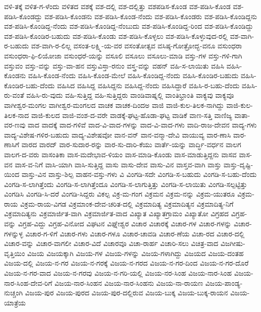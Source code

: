 {ವಳಿ-ತಕ್ಕೆ
ವಳಿತ-ಗ-ಳೆಂದು
ವಳಿತದ
ವಶಕ್ಕೆ
ವಶ-ದಲ್ಲಿ
ವಶ-ದಲ್ಲಿತ್ತು
ವಶಪಡಿಸ-ಕೊಂಡ
ವಶ-ಪಡಿಸಿ-ಕೊಂಡ
ವಶ-ಪಡಿಸಿ-ಕೊಂಡದ್ದು
ವಶ-ಪಡಿಸಿ-ಕೊಂಡನು
ವಶ-ಪಡಿಸಿ-ಕೊಂಡ-ನೆಂದು
ವಶ-ಪಡಿಸಿ-ಕೊಂಡರು
ವಶ-ಪಡಿಸಿ-ಕೊಂಡಿದ್ದನು
ವಶ-ಪಡಿಸಿ-ಕೊಂಡಿದ್ದ-ನೆಂದು
ವಶ-ಪಡಿಸಿ-ಕೊಂಡಿದ್ದ-ನೆಂಬುದು
ವಶ-ಪಡಿಸಿ-ಕೊಂಡಿದ್ದ-ರಿಂದ
ವಶ-ಪಡಿಸಿ-ಕೊಂಡಿದ್ದು
ವಶ-ಪಡಿಸಿ-ಕೊಂಡಿರ-ಬಹುದು
ವಶ-ಪಡಿಸಿ-ಕೊಂಡು
ವಶ-ಪಡಿಸಿ-ಕೊಳ್ಳಲು
ವಶ-ಪಡಿಸಿ-ಕೊಳ್ಳುವುದ-ರಲ್ಲಿ
ವಶ-ವಾಗಿ-ರ-ಬಹುದು
ವಶ-ವಾಗಿ-ರ-ಲಿಲ್ಲ
ವಸಂತ-ಲಕ್ಷ್ಮಿ-ಯ-ವರ
ವಸಂತೋತ್ಸವ
ವಸಿಷ್ಠ-ಗೋತ್ರೋದ್ಭ-ವನೂ
ವಸುಂಧರಾ
ವಸುಂಧರಾ-ಫಿ-ಲಿಯೋಜಾ
ವಸುಂಧರೆ-ಯನ್ನು
ವಸೂಲಿ
ವಸೂಲು
ವಸೂಲು-ಮಾಡಿ
ವಸ್ತು-ಗಳ
ವಸ್ತು-ಗಳಿ-ಗಾಗಿ
ವಸ್ತುವಂ
ವಸ್ತು-ವನ್ನು
ವಸ್ತು-ವಾ-ಹನ
ವಸ್ತುವಿಸ್ತಾ-ರನುಂ
ವಸ್ತ್ರ-ವನ್ನು
ವಹನ್
ವಹಿ-ಸ-ಲಾಯಿತು
ವಹಿಸಿ
ವಹಿಸಿ-ಕೊಂಡನು
ವಹಿಸಿ-ಕೊಂಡ-ನೆಂದು
ವಹಿಸಿ-ಕೊಂಡ-ಮೇಲೆ
ವಹಿಸಿ-ಕೊಂಡಿದ್ದ-ನೆಂದು
ವಹಿಸಿ-ಕೊಂಡಿರ-ಬಹುದು
ವಹಿಸಿ-ಕೊಂಡಿರ-ಬಹು-ದೆಂದು
ವಹಿಸಿದ
ವಹಿಸಿದ್ದ
ವಹಿಸಿದ್ದನು
ವಹಿಸಿದ್ದ-ನೆಂದು
ವಹಿಸಿದ್ದಾರೆ
ವಹಿಸಿ-ರ-ಬಹು-ದೆಂದು
ವಹಿಸಿ-ರು-ವಂತೆ
ವಹಿಸಿ-ರು-ವುದು
ವಹಿ-ಸುತ್ತಿದ್ದ
ವಹಿ-ಸುತ್ತಿದ್ದರು
ವಾಂಡಿವಾಷ್ನಲ್ಲಿ
ವಾಂತಿಭ್ರಾಂತಿ
ವಾಕ್ಯವು
ವಾಕ್ಯವೂ
ವಾಗೀಶ್ವರ-ಮಂಗಲ
ವಾಗೀಶ್ವರ-ಮಂಗಲದ
ವಾಚಕ
ವಾಚಕ-ದಿಂದಅ
ವಾಜಿ
ವಾಜಿ-ಕುಲ-ತಿಲಕ-ನಾಗಿದ್ದು
ವಾಜಿ-ಕುಲ-ತಿಲಕ-ನಾದ
ವಾಜಿ-ಕುಲದ
ವಾಜಿ-ವಂಶ-ದ-ವರೇ
ವಾಡಕ್ಕೆ-ಘಟ್ಟ-ಹೊಡಾ-ಘಟ್ಟ
ವಾಡಿಕೆ
ವಾಣ-ಸತ್ತಿ
ವಾಣಿಜ್ಯ
ವಾತಾ-ವರ-ಣವು
ವಾದ
ವಾದಕ್ಕೆ
ವಾದ-ಗಳಿವೆ
ವಾದ-ವಿ-ವಾದ-ಗಳನ್ನು
ವಾದ-ವಿ-ವಾದ-ಗಳು
ವಾದಿ-ರಾಜ-ದೇವನ
ವಾದ್ಯ-ಗಳು
ವಾದ್ಯ-ವಿಶೇಷ-ಗಳಿರ-ಬಹುದು
ವಾದ್ಯ-ವಿಶೇಷವೋ
ವಾನ-ವನ್
ವಾನ-ವನ್ಮಾ-ದೇವಿ
ವಾಯುವ್ಯ
ವಾರ-ಣಾಸಿ
ವಾರ-ಣಾಸಿಗೆ
ವಾರದ
ವಾರದ್
ವಾರ-ಸುದಾರ-ರನ್ನು
ವಾರ-ಸು-ದಾರಿ-ಕೆಯು
ವಾರ್ತೆ-ಯನ್ನು
ವಾರ್ದ್ಧಿ-ವರ್ಧನ
ವಾಲಗ
ವಾಲಗ-ದ-ವರು
ವಾಸಂತಿಕಾ
ವಾಸ-ಮದೇಭಾವ-ಳಿಯಂ
ವಾಸ-ಮಾಡಿ-ಕೊಂಡು
ವಾಸ-ಮಾಡುತ್ತಿದ್ದನು
ವಾಸವ
ವಾಸ-ವನ
ವಾಸ-ವ-ನಿಗೆ
ವಾಸಿ-ಯಾಗಿ
ವಾಸಿ-ಸುತ್ತಿದ್ದ
ವಾಸು
ವಾಸು-ದೇವ
ವಾಸು-ವಿನ
ವಾಸ್ತವ-ವಾಗಿ
ವಾಸ್ತು
ವಾಸ್ತು-ದೃಷ್ಟಿ-ಯಿಂದ
ವಾಸ್ತು-ವಿನ
ವಾಸ್ತು-ಶಿಲ್ಪ
ವಾಹನ-ವಸ್ತು-ಗಳು
ವಿ
ವಿಂಗಡಿ-ಸದೇ
ವಿಂಗಡಿ-ಸ-ಬಹುದು
ವಿಂಗಡಿ-ಸ-ಬಹು-ದೆಂದು
ವಿಂಗಡಿ-ಸ-ಲಾಗಿತ್ತೆಂದು
ವಿಂಗಡಿ-ಸ-ಲಾಗಿತ್ತೆಂದೂ
ವಿಂಗಡಿ-ಸ-ಲಾಗುತ್ತಿತ್ತು
ವಿಂಗಡಿ-ಸ-ಲಾಯಿತು
ವಿಂಗಡಿ-ಸಲ್ಪಟ್ಟಿತ್ತು
ವಿಂಗಡಿಸಿ
ವಿಂಗಡಿ-ಸಿ-ದರೆ
ವಿಂಗಡಿ-ಸಿದ್ದರು
ವಿಕಲ್ಪ
ವಿಕ್ರ-ಮ-ಗಂಗ
ವಿಕ್ರಮನ
ವಿಕ್ರಮ-ನನ್ನು
ವಿಕ್ರಮ-ಯುತರೂ
ವಿಕ್ರಮ-ರಾಯ
ವಿಕ್ರಮ-ರಾಯ-ವಿಗಡ
ವಿಕ್ರಮಾಂಕ-ದೇವ-ಚರಿತ-ದಲ್ಲಿ
ವಿಕ್ರಮಾದಿತ್ಯ
ವಿಕ್ರಮಾದಿತ್ಯನ
ವಿಕ್ರಮಾದಿತ್ಯ-ನಿಗೆ
ವಿಕ್ರಮಾದಿತ್ಯನು
ವಿಕ್ರಮಾರ್ಜಿತ-ವಾಗಿ
ವಿಕ್ರಮಾರ್ಜಿತ-ವಾದ
ವಿಖ್ಯಾತ
ವಿಖ್ಯಾತಗ್ರಾಮಂ
ವಿಖ್ಯಾತೋ
ವಿಗ್ರಹದ
ವಿಗ್ರಹ-ವನ್ನು
ವಿಗ್ರಹ-ವಿದ್ದು
ವಿಗ್ರಹ-ವಿನೋದ
ವಿಘಟನ
ವಿಘ್ನೇಶ್ವರ
ವಿಚಾರ
ವಿಚಾರಕ್ಕೆ
ವಿಚಾರ-ಗಳ
ವಿಚಾರ-ಗಳನ್ನು
ವಿಚಾರ-ಗಳನ್ನುಳ್ಳ
ವಿಚಾರ-ಗ-ಳಿಗೆ
ವಿಚಾರ-ಗಳು
ವಿಚಾರ-ಗಳೂ
ವಿಚಾರ-ಚಾವಡಿ
ವಿಚಾರ-ಣೆಯ
ವಿಚಾ-ರದ
ವಿಚಾರ-ದಲ್ಲಿ
ವಿಚಾರ-ವನ್ನು
ವಿಚಾರ-ವಾಗಲೀ
ವಿಚಾರ-ವಿದೆ
ವಿಚಾರವೂ
ವಿಚಾ-ರಾರ್ಹ
ವಿಚಾರಿ-ಸಲು
ವಿಚಿತ್ರ-ವಾದ
ವಿಜಗೀಷು-ವೃತ್ತಿಯಿಂ
ವಿಜಯ
ವಿಜಯಕ್ಕಾಗಿ
ವಿಜಯ-ಗಳ
ವಿಜಯ-ಗಳನ್ನು
ವಿಜಯ-ಗಳಾಗಿದ್ದು
ವಿಜಯದ
ವಿಜಯ-ದಂತಹ
ವಿಜಯ-ದಲ್ಲಿ
ವಿಜಯ-ನ-ಗರ
ವಿಜಯ-ನ-ಗರಕ್ಕೆ
ವಿಜಯ-ನ-ಗರದ
ವಿಜಯ-ನ-ಗರ-ದಿಂದ
ವಿಜಯ-ನ-ಗರ-ದೊರೆ
ವಿಜಯ-ನ-ಗರ-ವಾದ
ವಿಜಯ-ನ-ಗರವು
ವಿಜಯ-ನ-ಗರಿ-ಯಲ್ಲಿ
ವಿಜಯ-ನರ-ಸಿಂಹ
ವಿಜಯ-ನಾರ-ಸಿಂಹ
ವಿಜಯ-ನಾರ-ಸಿಂಹ-ದೇವ-ರಿಗೆ
ವಿಜಯ-ನಾರ-ಸಿಂಹನ
ವಿಜಯ-ನಾರ-ಸಿಂಹನು
ವಿಜಯ-ನಾ-ರಾಯಣ
ವಿಜಯ-ಪಾಂಡ್ಯ-ನುಚ್ಚಂಗಿ
ವಿಜಯ-ಪುರ
ವಿಜಯ-ಪುರದ
ವಿಜಯ-ಪುರ-ದಲ್ಲಿರುವ
ವಿಜಯ-ಬುಕ್ಕ
ವಿಜಯ-ಬುಕ್ಕ-ರಾಯನ
ವಿಜಯ-ಯಾತ್ರೆಯ
}
